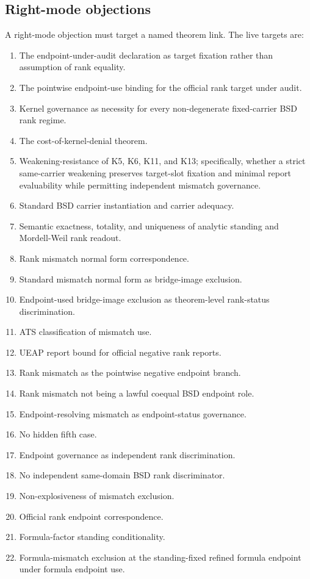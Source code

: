 \documentclass[11pt]{article}
\begin{document}
\subsection{Right-mode objections}
A right-mode objection must target a named theorem link. The live targets are:
\begin{enumerate}
\item The endpoint-under-audit declaration as target fixation rather than assumption of rank equality.
\item The pointwise endpoint-use binding for the official rank target under audit.
\item Kernel governance as necessity for every non-degenerate fixed-carrier BSD rank regime.
\item The cost-of-kernel-denial theorem.
\item Weakening-resistance of K5, K6, K11, and K13; specifically, whether a strict same-carrier weakening preserves target-slot fixation and minimal report evaluability while permitting independent mismatch governance.
\item Standard BSD carrier instantiation and carrier adequacy.
\item Semantic exactness, totality, and uniqueness of analytic standing and Mordell-Weil rank readout.
\item Rank mismatch normal form correspondence.
\item Standard mismatch normal form as bridge-image exclusion.
\item Endpoint-used bridge-image exclusion as theorem-level rank-status discrimination.
\item ATS classification of mismatch use.
\item UEAP report bound for official negative rank reports.
\item Rank mismatch as the pointwise negative endpoint branch.
\item Rank mismatch not being a lawful coequal BSD endpoint role.
\item Endpoint-resolving mismatch as endpoint-status governance.
\item No hidden fifth case.
\item Endpoint governance as independent rank discrimination.
\item No independent same-domain BSD rank discriminator.
\item Non-explosiveness of mismatch exclusion.
\item Official rank endpoint correspondence.
\item Formula-factor standing conditionality.
\item Formula-mismatch exclusion at the standing-fixed refined formula endpoint under formula endpoint use.
\end{enumerate}
\end{document}
